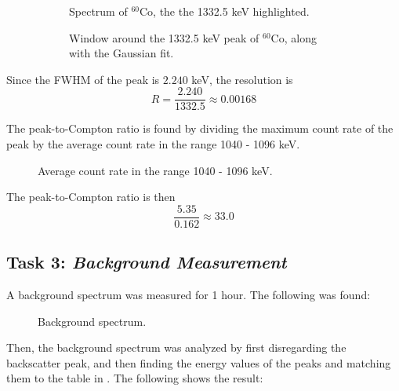 \documentclass{article}
\begin{document}
\begin{figure}[h!]
	\centering
	\begin{subfigure}[t]{0.45\textwidth}
		\centering
		\scalebox{0.5}{}
		\caption{Spectrum of $^{60}$Co, the the 1332.5 keV highlighted.}
		\label{fig:Co60Broad}
	\end{subfigure}
	\hspace{0.5cm}
	\begin{subfigure}[t]{0.45\textwidth}
		\centering
		\scalebox{0.5}{}
		\caption{Window around the 1332.5 keV peak of $^{60}$Co, along with the Gaussian fit.}
		\label{fig:Co60window}
	\end{subfigure}
	\caption{}
	\label{fig:energyresolution}
\end{figure}

Since the FWHM of the peak is $2.240$ keV, the resolution is 
\[R = \frac{2.240}{1332.5} \approx \boxed{0.00168}\]

The peak-to-Compton ratio is found by dividing the maximum count rate of the peak by the average count rate in the range 1040 - 1096 keV. 

\begin{figure}[h!]
	\centering
	\scalebox{1}{}
	\caption{Average count rate in the range 1040 - 1096 keV.}
	\label{fig:AvgCountRate}
\end{figure}

The peak-to-Compton ratio is then
\[ \frac{5.35}{0.162} \approx \boxed{33.0} \]

\pagebreak{}

\subsection{Task 3: \textit{Background Measurement}}

A background spectrum was measured for 1 hour. The following was found:

\begin{figure}[h!]
	\centering
	\scalebox{1}{}
	\caption{Background spectrum.}
	\label{fig:Background}
\end{figure}

Then, the background spectrum was analyzed by first disregarding the backscatter peak, and then finding the energy values of the peaks and matching them to the table in \cite{plotzki_2024_highresolution}. The following shows the result:
\end{document}
